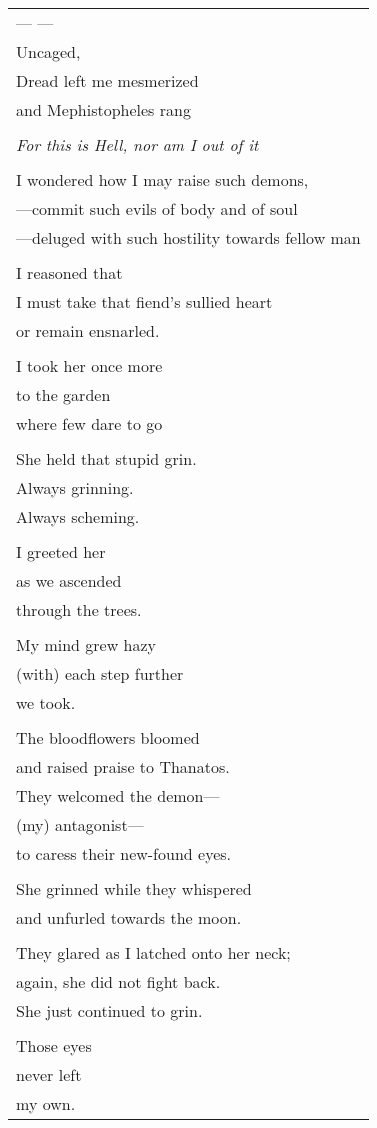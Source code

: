 \documentclass{article}
\begin{document}
\begin{tabular}{l}
\\
--- --- \\
Uncaged, \\
Dread left me mesmerized \\
and Mephistopheles rang \\
\\
\textit{For this is Hell, nor am I out of it} \\
\\
I wondered how I may raise such demons, \\
---commit such evils of body and of soul \\
---deluged with such hostility towards fellow man \\
\\
I reasoned that \\
I must take that fiend's sullied heart \\
or remain ensnarled. \\
\\
I took her once more \\
to the garden \\
where few dare to go \\
\\
She held that stupid grin. \\
Always grinning. \\
Always scheming. \\
\\
I greeted her \\
as we ascended \\
through the trees. \\
\\
My mind grew hazy \\
(with) each step further \\
we took. \\
\\
The bloodflowers bloomed \\
and raised praise to Thanatos.\\
They welcomed the demon--- \\
(my) antagonist--- \\
to caress their new-found eyes. \\
\\
She grinned while they whispered \\
and unfurled towards the moon. \\
\\
They glared as I latched onto her neck; \\
again, she did not fight back. \\
She just continued to grin. \\
\\
Those eyes \\
never left \\
my own. \\
\end{tabular} \\
\end{document}
